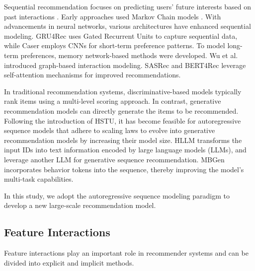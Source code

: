 Sequential recommendation focuses on predicting users' future interests based on past interactions \cite{yin2024learning, han2024efficient, yin2023apgl4sr, han2023guesr}. Early approaches used Markov Chain models \cite{rendle2010factorizing}. With advancements in neural networks, various architectures have enhanced sequential modeling. GRU4Rec \cite{hidasi2015session} uses Gated Recurrent Units to capture sequential data, while Caser \cite{caser} employs CNNs for short-term preference patterns. To model long-term preferences, memory network-based methods \cite{chen2018sequential, huang2018improving, zhang2024learning} were developed. Wu et al. \cite{wu2019session} introduced graph-based interaction modeling. SASRec \cite{kang2018self} and BERT4Rec \cite{bert4rec} leverage self-attention mechanisms for improved recommendations.

In traditional recommendation systems, discriminative-based models typically rank items using a multi-level scoring approach. 
In contrast, generative recommendation models can directly generate the items to be recommended. Following the introduction of HSTU, it has become feasible for autoregressive sequence models that adhere to scaling laws to evolve into generative recommendation models by increasing their model size. HLLM \cite{chen2024hllm} transforms the input IDs into text information encoded by large language models (LLMs), and leverage another LLM for generative sequence recommendation. MBGen \cite{liu2024multi} incorporates behavior tokens into the sequence, thereby improving the model's multi-task capabilities.

In this study, we adopt the autoregressive sequence modeling paradigm to develop a new large-scale recommendation model.

\subsection{Feature Interactions}

Feature interactions play an important role in recommender systems \cite{zhang2022clustering, xu2024multi, zhang2024unified, wang2021hypersorec} and can be divided into explicit and implicit methods.

